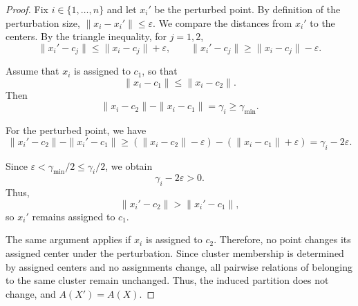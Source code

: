 \documentclass[10pt,a4paper]{amsart}
\begin{document}
\begin{proof}
Fix $i \in \{1, \ldots, n\}$ and let $x_i'$ be the perturbed point. By definition of the perturbation size,
$\|x_i - x_i'\| \le \varepsilon.$
We compare the distances from $x_i'$ to the centers. By the triangle inequality, for $j = 1,2$,
\[
\|x_i' - c_j\| \le \|x_i - c_j\| + \varepsilon, \qquad
\|x_i' - c_j\| \ge \|x_i - c_j\| - \varepsilon.
\]

Assume that $x_i$ is assigned to $c_1$, so that
\[
\|x_i - c_1\| \le \|x_i - c_2\|.
\]
Then
\[
\|x_i - c_2\| - \|x_i - c_1\| = \gamma_i \ge \gamma_{\min}.
\]

For the perturbed point, we have
\[
\|x_i' - c_2\| - \|x_i' - c_1\|
\ge (\|x_i - c_2\| - \varepsilon) - (\|x_i - c_1\| + \varepsilon)
= \gamma_i - 2\varepsilon.
\]

Since $\varepsilon < \gamma_{\min}/2 \le \gamma_i/2$, we obtain
\[
\gamma_i - 2\varepsilon > 0.
\]
Thus,
\[
\|x_i' - c_2\| > \|x_i' - c_1\|,
\]
so $x_i'$ remains assigned to $c_1$.

The same argument applies if $x_i$ is assigned to $c_2$. Therefore, no point changes its assigned center under the perturbation. Since cluster membership is determined by assigned centers and no assignments change, all pairwise relations of belonging to the same cluster remain unchanged. Thus, the induced partition does not change, and $A(X') = A(X)$.
\end{proof}
\end{document}
